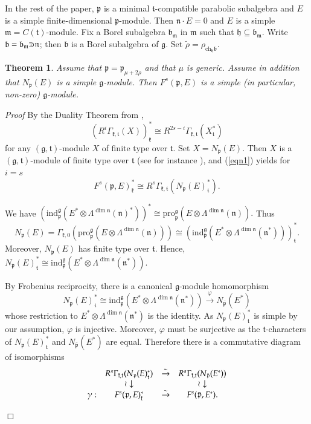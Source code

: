 \documentclass[11pt]{amsart}
\newcounter{theorem}
\newtheorem{theo}{Theorem}[section]
\renewenvironment{proof}{ \emph{Proof}}{$\Box$}
\renewcommand{\tt}{\mathfrak{t}}
\newcommand{\kk}{\mathfrak{k}}
\newcommand{\nn}{\mathfrak{n}}
\newcommand{\mm}{\mathfrak{m}}
\newcommand{\hh}{\mathfrak{h}}
\newcommand{\pp}{\mathfrak{p}}
\renewcommand{\gg}{\mathfrak{g}}
\newcommand{\bb}{\mathfrak{b}}
\newcommand{\refeq}[1]{(\ref{#1})}
\newcommand{\ch}{\mathrm{ch}}
\newcommand{\pro}{\mathrm{pro}}
\newcommand{\ind}{\mathrm{ind}}
\def\crplus{\hbox{$\supset${\raise1.05pt\hbox{\kern -0.55em ${\scriptscriptstyle +}$}}\ }}
\begin{document}
In the rest of the paper, $\pp$ is a minimal $\tt$-compatible parabolic subalgebra and $E$ is a simple finite-dimensional $\pp$-module. Then $\nn\cdot E=0$ and $E$ is a simple $\mm=C(\tt)$-module. Fix a Borel subalgebra $\bb_{\mm}$ in $\mm$ such that $\hh\subseteq\bb_{\mm}$. Write $\bb=\bb_{\mm}\crplus\nn$; then $\bb$ is a Borel subalgebra of $\gg$. Set $\tilde{\rho} = \rho_{\ch_{\hh} \bb} $.
\begin{theo}\label{th2.1}
Assume that $\pp=\pp_{\mu+2\rho}$ and that $\mu$ is generic. Assume in addition that $N_\pp(E)$ is a simple $\gg$-module. Then $F^s(\pp,E)$ is a simple (in particular, non-zero) $\gg$-module.  
\end{theo}
\begin{proof}
 By the Duality Theorem from \cite{EW},
 \begin{equation}\label{eqn1}
 (R^i\Gamma_{\kk,\tt}(X))^*_\kk\cong R^{2s-i}\Gamma_{\kk,\tt}(X_\tt^*)
 \end{equation}
 for any $(\gg,\tt)$-module $X$ of finite type over $\tt$. Set $X=N_\pp(E)$. Then $X$ is a $(\gg,\tt)$-module of finite type over $\tt$ (see for instance \cite{Z}), and \refeq{eqn1} yields for $i=s$ $$F^s(\pp,E)_\kk^*\cong R^s\Gamma_{\kk,\tt}(N_\pp(E)_\tt^*).$$

We have $(\ind_\pp^\gg(E^*\otimes\Lambda^{\dim \nn}(\nn)^*))^*\cong\pro_\pp^\gg(E\otimes\Lambda^{\dim\nn}(\nn)).$ Thus $$N_\pp(E)=\Gamma_{\kk,0}(\pro_\pp^\gg(E\otimes\Lambda^{\dim\nn}(\nn)))\cong (\ind_\pp^\gg(E^*\otimes\Lambda^{\dim\nn}(\nn^*)))^*_\tt.$$ Moreover, $N_\pp(E)$ has finite type over $\tt$. Hence, $N_\pp(E)^*_\tt\cong\ind_\pp^\gg(E^*\otimes\Lambda^{\dim\nn}(\nn^*))$.
 
By Frobenius reciprocity, there is a canonical $\gg$-module homomorphism $$N_\pp(E)_\tt^*\cong\ind_\pp^\gg(E^*\otimes\Lambda^{\dim\nn}(\nn^*))\stackrel{\varphi}{\rightarrow} N_{\bar{\pp}}(E^*)$$ whose restriction to $E^*\otimes\Lambda^{\dim\nn}(\nn^*)$ is the identity. As $N_\pp(E)_\tt^*$ is simple by our assumption, $\varphi$ is injective. Moreover, $\varphi$ must be surjective as the $\tt$-characters of $N_\pp(E)_\tt^*$ and $N_{\bar{\pp}}(E^*)$ are equal. Therefore there is a commutative diagram of isomorphisms
 $$\begin{array}[c]{cccc}
& R^s\Gamma_{\kk,\tt}(N_\pp(E)^*_\tt)& \stackrel{\sim}{\rightarrow}& R^s\Gamma_{\kk,\tt}(N_{\bar{\pp}}(E^*))\\
 &\wr\downarrow&&\wr\downarrow\\
 \gamma :& F^s(\pp,E)_\kk^*& \stackrel{\sim}{\rightarrow}&F^s(\bar{\pp},E^*).
 \end{array}$$
 

\end{proof}
\end{document}
